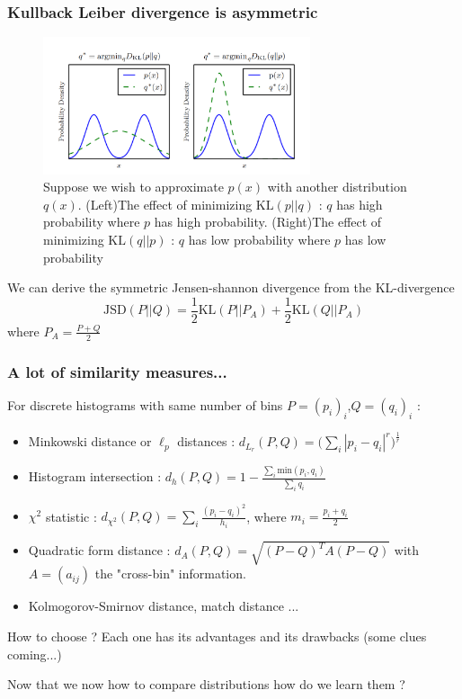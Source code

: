 \documentclass[french,9pt]{beamer}
\begin{document}
\begin{frame}
\frametitle{Kullback Leiber divergence is asymmetric}

\begin{figure}
  \begin{center}
    \includegraphics[width=0.7\textwidth]{fig/asymkl.png}
  \end{center}
  \caption{{\small Suppose we wish to approximate $p(x)$ with another distribution $q(x)$. (Left)The effect of minimizing $\text{KL}(p||q)$ : $q$ has high probability where $p$ has high probability. (Right)The effect of minimizing $\text{KL}(q||p)$ : $q$ has low probability where $p$ has low probability \cite{DBLP:journals/nature/LeCunBH15}}}
\end{figure}

We can derive the symmetric Jensen-shannon divergence from the KL-divergence 
\begin{equation}
\label{kldiv}
\text{JSD}(P||Q)=\frac{1}{2} \text{KL}(P||P_{A}) + \frac{1}{2} \text{KL}(Q||P_{A})
\end{equation}
where $P_{A}=\frac{P+Q}{2}$
 
\end{frame}

\begin{frame}
\frametitle{A lot of similarity measures...  \cite{Rubner2000}}

For discrete histograms with same number of bins $P=(p_{i})_{i}$,$Q=(q_{i})_{i}$ :

\begin{itemize}
\item Minkowski distance or $\ell_{p}$ distances : $d_{L_{r}}(P,Q)= \big(\sum_{i} |p_{i}-q_{i}|^{r}\big)^{\frac{1}{r}}$
\item Histogram intersection : $d_{h}(P,Q)= 1-\frac{\sum_{i} \text{min}(p_{i},q_{i})}{\sum_{i}q_{i}}$
\item$\chi^{2}$ statistic : $d_{\chi^{2}}(P,Q)= \sum_{i} \frac{(p_{i}-q_{i})^{2}}{h_{i}}$, where $m_{i}=\frac{p_{i}+q_{i}}{2}$
\item Quadratic form distance : $d_{A}(P,Q)=\sqrt{(P-Q)^{T} A (P-Q)}$ with $A=(a_{ij})$ the "cross-bin" information.
\item Kolmogorov-Smirnov distance, match distance ...
\end{itemize}

\pause 

How to choose ? Each one has its advantages and its drawbacks (some clues coming...)

\pause 
Now that we now how to compare distributions how do we learn them ?

\end{frame}
\end{document}
